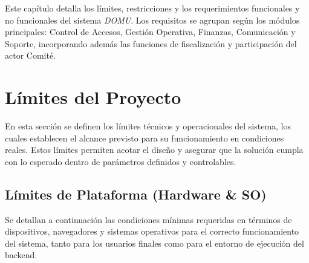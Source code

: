 Este capítulo detalla los límites, restricciones y los requerimientos funcionales y no funcionales del sistema \textit{DOMU}.
Los requisitos se agrupan según los módulos principales: Control de Accesos, Gestión Operativa, Finanzas, Comunicación y Soporte, incorporando además las funciones de fiscalización y participación del actor Comité.

\section{Límites del Proyecto}
En esta sección se definen los límites técnicos y operacionales del sistema, los cuales establecen el alcance previsto para su funcionamiento en condiciones reales. Estos límites permiten acotar el diseño y asegurar que la solución cumpla con lo esperado dentro de parámetros definidos y controlables.
\label{sec:limites}

\subsection{Límites de Plataforma (Hardware \& SO)}

Se detallan a continuación las condiciones mínimas requeridas en términos de dispositivos, navegadores y sistemas operativos para el correcto funcionamiento del sistema, tanto para los usuarios finales como para el entorno de ejecución del backend.

